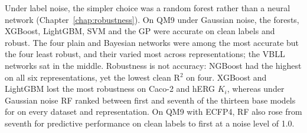 Under label noise, the simpler choice was a random forest rather than a neural network (Chapter~\ref{chap:robustness}). On QM9 under Gaussian noise, the forests, XGBoost, LightGBM, SVM and the GP were accurate on clean labels and robust. The four plain and Bayesian networks were among the most accurate but the four least robust, and their \aucnorm{} varied most across representations; the VBLL networks sat in the middle. Robustness is not accuracy: NGBoost had the highest \aucnorm{} on all six representations, yet the lowest clean R$^2$ on four. XGBoost and LightGBM lost the most robustness on Caco-2 and hERG $K_i$, whereas under Gaussian noise RF ranked between first and seventh of the thirteen base models for \aucnorm{} on every dataset and representation. On QM9 with ECFP4, RF also rose from seventh for predictive performance on clean labels to first at a noise level of 1.0.

